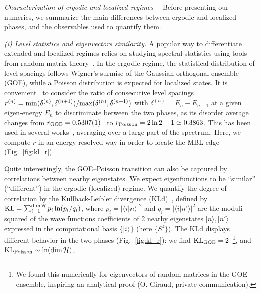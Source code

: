 \documentclass[prl,a4paper,twocolumn,groupedaddress,english,showpacs]{revtex4-1}
\begin{document}
{\it{Characterization of ergodic and localized regimes---}} Before presenting our numerics, we
summarize the main differences between ergodic and localized phases, and the observables used to quantify
them. 

{\it{(i) Level statistics and eigenvectors similarity. }} A popular way to differentiate extended and localized regimes relies on studying spectral statistics using tools from random
matrix theory~\cite{rmt}. In the ergodic regime, the statistical distribution of level spacings
follows Wigner's surmise of the Gaussian orthogonal ensemble (GOE), while a Poisson distribution is
expected for localized states. It is convenient~\cite{oganesyan_localization_2007} to consider the
ratio of consecutive level spacings
$r^{(n)}={\rm{min}}(\delta^{(n)},\delta^{(n+1)})/{\rm{max}}(\delta^{(n)},\delta^{(n+1)})$ with
$\delta^{(n)}=E_n-E_{n-1}$ at a given eigen-energy $E_n$ to discriminate between the two phases, as
its disorder average changes from ${{r}}_{\rm GOE}=0.5307(1)$~\cite{atas_distribution_2013}
to ${{r}}_{\rm Poisson}=2\ln 2-1\simeq 0.3863$. This has been used in several
works~\cite{oganesyan_localization_2007,pal_many-body_2010,cuevas_level_2012,johri_numerical_2014,laumann_many_2014,bauer_area_2013},
averaging over a large part of the  spectrum. Here, we compute ${{r}}$ in an
energy-resolved way in order to locate the MBL edge (Fig.~\ref{fig:kl_r}). 

Quite interestingly, the GOE--Poisson transition can also be captured by correlations between nearby
eigenstates. We expect eigenfunctions to be ``similar'' (``different'') in the ergodic (localized)
regime. We quantify the degree of correlation by the Kullback-Leibler divergence
(KLd)~\cite{kullback1951}, defined by ${\rm KL}=\sum_{i=1}^{\dim{\cal H}}p_i\ln(p_i/q_i)$, where
$p_i=|\langle i | n \rangle|^2$ and $q_i=|\langle i | n' \rangle|^2$ are the moduli squared of the
wave functions coefficients of 2 nearby eigenstates $|n\rangle, | n' \rangle$ expressed in the
computational basis $\{ |i\rangle \}$ (here  $\{S^z\}$). The KLd displays different behavior in
the two phases (Fig.~\ref{fig:kl_r}): we find ${\rm{KL}}_{\rm GOE}=2$~\footnote{We found this 
numerically for eigenvectors of random matrices in the GOE ensemble, inspiring an analytical proof (O. Giraud, private communication).}, 
and ${\rm{KL}}_{\rm Poisson}\sim \ln (\dim{\cal
H})$.
\end{document}
